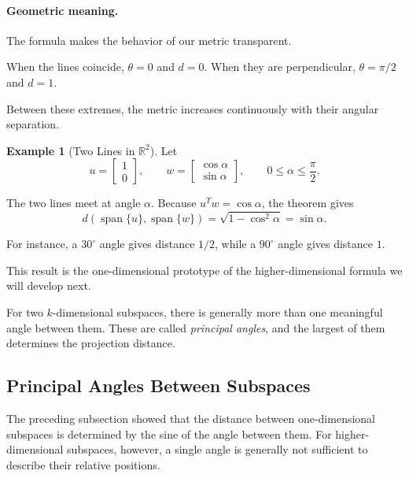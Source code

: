\documentclass[14pt,letterpaper]{article}
\theoremstyle{plain}
\theoremstyle{definition}
\newtheorem{example}[theorem]{Example}
\theoremstyle{remark}
\newcommand{\R}{\mathbb{R}}
\DeclareMathOperator{\Span}{span}
\begin{document}
\paragraph{Geometric meaning.}

The formula makes the behavior of our metric
transparent.

When the lines coincide, $\theta=0$ and $d=0$.
When they are perpendicular, $\theta=\pi/2$
and $d=1$.

Between these extremes, the metric increases
continuously with their angular separation.

\begin{example}[Two Lines in $\R^2$]

Let
\[
u=\begin{bmatrix}1\\0\end{bmatrix},
\qquad
w=\begin{bmatrix}\cos\alpha\\\sin\alpha\end{bmatrix},
\qquad 0\leq\alpha\leq\frac{\pi}{2}.
\]

The two lines meet at angle $\alpha$.
Because $u^Tw=\cos\alpha$, the theorem gives
\[
\boxed{
d(\Span\{u\},\Span\{w\})
=\sqrt{1-\cos^2\alpha}=\sin\alpha.
}
\]

For instance, a $30^\circ$ angle gives distance
$1/2$, while a $90^\circ$ angle gives distance $1$.

\end{example}

This result is the one-dimensional prototype of the
higher-dimensional formula we will develop next.

For two $k$-dimensional subspaces, there is generally
more than one meaningful angle between them. These
are called \emph{principal angles}, and the largest
of them determines the projection distance.


\subsection{Principal Angles Between Subspaces}
\label{subsec:principal_angles}

The preceding subsection showed that the distance between
one-dimensional subspaces is determined by the sine of
the angle between them. For higher-dimensional subspaces,
however, a single angle is generally not sufficient to
describe their relative positions.
\end{document}
